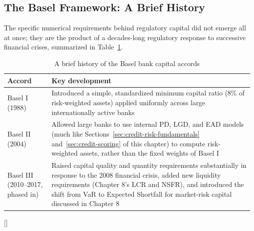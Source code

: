 \documentclass[../ai_in_finance]{subfiles}
\begin{document}
\subsection{The Basel Framework: A Brief History}

The specific numerical requirements behind regulatory capital did not emerge all at once; they are the product of a decades-long regulatory response to successive financial crises, summarized in Table~\ref{tab:basel_history}.

\begin{table}[htbp]
\centering
\begin{lrbox}{\bookmeasuredbox}
\begin{tabular}{p{2.2cm}p{9.8cm}}
\toprule
Accord & Key development \\
\midrule
Basel I (1988) & Introduced a simple, standardized minimum capital ratio (8\% of risk-weighted assets) applied uniformly across large internationally active banks \\
Basel II (2004) & Allowed large banks to use internal PD, LGD, and EAD models (much like Sections~\ref{sec:credit-risk-fundamentals} and~\ref{sec:credit-scoring} of this chapter) to compute risk-weighted assets, rather than the fixed weights of Basel I \\
Basel III (2010--2017, phased in) & Raised capital quality and quantity requirements substantially in response to the 2008 financial crisis, added new liquidity requirements (Chapter 8's LCR and NSFR), and introduced the shift from VaR to Expected Shortfall for market-risk capital discussed in Chapter 8 \\
\bottomrule
\end{tabular}
\end{lrbox}
\ifdim\wd\bookmeasuredbox<0.65\linewidth
\setlength{\bookcapwidth}{0.65\linewidth}
\else
\setlength{\bookcapwidth}{\wd\bookmeasuredbox}
\fi
{}[\bookcapwidth]{
\usebox{\bookmeasuredbox}
}{
\caption{A brief history of the Basel bank capital accords}
\label{tab:basel_history}
}
\end{table}
\end{document}
